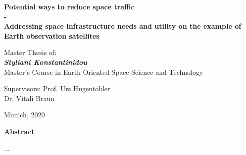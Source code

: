 \vspace{3.5cm}
\begin{center}
\Large{\textbf{Potential ways to reduce space traffic \\- \\}}
\Large{\textbf{Addressing space infrastructure needs and utility on the example of Earth observation satellites}}
\end{center}
\vspace{2.2cm}
\begin{center}
\large{Master Thesis of:\\
\textit{\textbf{Styliani Konstantinidou}} \\}
\vspace{1cm}
\large{Master's Course in Earth Oriented Space Science and Technology}
\end{center}

\vspace{2.65cm}
\begin{flushleft}
\large{Supervisors: Prof. Urs Hugentobler \\ \hspace*{2.7cm}Dr. Vitali Braun}
\end{flushleft}

\vfill
\begin{center}
\normalsize Munich, 2020
\end{center}



\newpage \mbox{} %
\newpage \mbox{}
\thispagestyle{empty}
\begin{center}
\Large{\textbf{Abstract}} 
\end{center}
\par 	
...

%


\vspace{\fill} %


